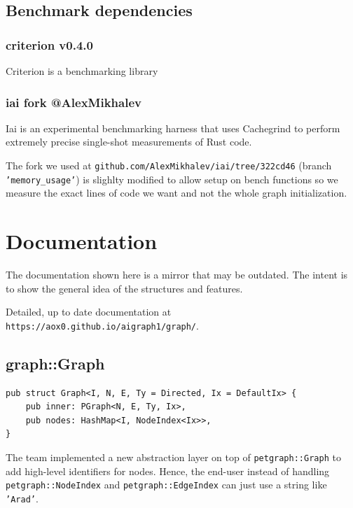 \subsection{Benchmark dependencies}

\subsubsection{criterion v0.4.0}

Criterion is a benchmarking library 

\subsubsection{iai fork @AlexMikhalev}

Iai is an experimental benchmarking harness that uses Cachegrind to perform extremely precise
single-shot measurements of Rust code.

The fork we used at \texttt{github.com/AlexMikhalev/iai/tree/322cd46} (branch \texttt{'memory\_usage'}) is slighlty
modified to allow setup on bench functions so we measure the exact lines of code we want and not the whole
graph initialization.

\newpage
\section{Documentation}

The documentation shown here is a mirror that may be outdated. 
The intent is to show the general idea of the structures and features.

Detailed, up to date documentation at \texttt{https://aox0.github.io/aigraph1/graph/}.

\subsection{graph::Graph}

\begin{verbatim}
pub struct Graph<I, N, E, Ty = Directed, Ix = DefaultIx> {
    pub inner: PGraph<N, E, Ty, Ix>,
    pub nodes: HashMap<I, NodeIndex<Ix>>,
}
\end{verbatim}

The team implemented a new abstraction layer on top of \texttt{petgraph::Graph} to add high-level identifiers for nodes.
Hence, the end-user instead of handling \texttt{petgraph::NodeIndex} and \texttt{petgraph::EdgeIndex} can just use a string like \texttt{'Arad'}.

